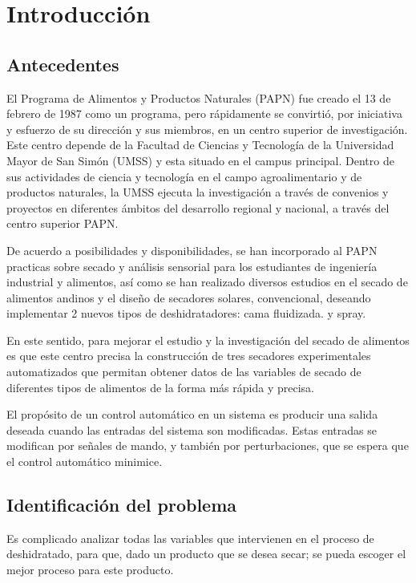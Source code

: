 \chapter{Introducción}\label{cap:intro}
\section{Antecedentes}
El  Programa de Alimentos y Productos Naturales (PAPN) fue creado el 13 de
febrero de 1987 como un programa, pero rápidamente se convirtió, por iniciativa
y esfuerzo de su dirección y sus miembros, en un centro superior de
investigación. Este centro depende de la Facultad de Ciencias y Tecnología de la
Universidad Mayor de San Simón (UMSS) y esta situado en el campus principal.
Dentro de sus actividades de ciencia y tecnología en el campo agroalimentario y
de productos naturales, la UMSS ejecuta la investigación a través de convenios y
proyectos en diferentes ámbitos del desarrollo regional y nacional, a través del
centro superior PAPN.

De acuerdo a posibilidades y disponibilidades, se han incorporado al PAPN
practicas sobre secado y análisis sensorial para los estudiantes de ingeniería
industrial y alimentos, así como se han realizado diversos estudios en el secado
de alimentos andinos y el diseño de secadores solares, convencional, deseando
implementar 2 nuevos tipos de deshidratadores: cama fluidizada. y spray.

En este sentido, para mejorar el estudio y la investigación del secado de
alimentos es que este centro precisa la construcción de tres secadores
experimentales automatizados que permitan obtener datos de las variables de
secado de diferentes tipos de alimentos de la forma más rápida y precisa.

El propósito de un control automático en un sistema es producir una salida
deseada cuando las entradas del sistema son modificadas. Estas entradas se
modifican por señales de mando, y también por perturbaciones, que se espera que
el control automático minimice.

\section{Identificación del problema}

Es complicado analizar todas las variables que intervienen en el proceso de
deshidratado, para que, dado un producto que se desea secar; se pueda escoger el
mejor proceso para este producto.

